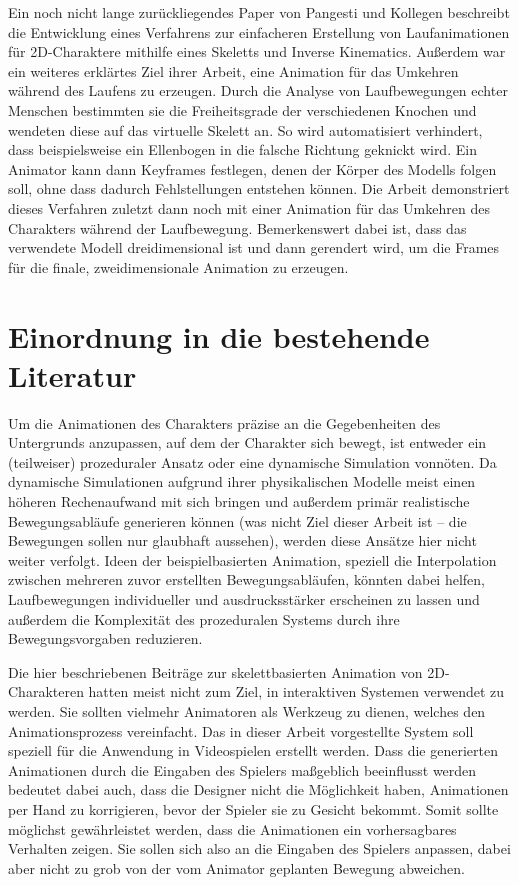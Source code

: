 Ein noch nicht lange zurückliegendes Paper von Pangesti und Kollegen\cite{pangesti2019analysis} beschreibt die Entwicklung eines Verfahrens zur einfacheren Erstellung von Lauf\-a\-ni\-ma\-tio\-nen für 2D-Charaktere mithilfe eines Skeletts und Inverse Kinematics. Außerdem war ein weiteres erklärtes Ziel ihrer Arbeit, eine Animation für das Umkehren während des Laufens zu erzeugen. Durch die Analyse von Laufbewegungen echter Menschen bestimmten sie die Freiheitsgrade der verschiedenen Knochen und wendeten diese auf das virtuelle Skelett an. So wird automatisiert verhindert, dass beispielsweise ein Ellenbogen in die falsche Richtung geknickt wird. Ein Animator kann dann Keyframes festlegen, denen der Körper des Modells folgen soll, ohne dass dadurch Fehlstellungen entstehen können. Die Arbeit demonstriert dieses Verfahren zuletzt dann noch mit einer Animation für das Umkehren des Charakters während der Laufbewegung. Bemerkenswert dabei ist, dass das verwendete Modell dreidimensional ist und dann gerendert wird, um die Frames für die finale, zweidimensionale Animation zu erzeugen.


\section{Einordnung in die bestehende Literatur}
Um die Animationen des Charakters präzise an die Gegebenheiten des Untergrunds anzupassen, auf dem der Charakter sich bewegt, ist entweder ein (teilweiser) prozeduraler Ansatz oder eine dynamische Simulation vonnöten. Da dynamische Simulationen aufgrund ihrer physikalischen Modelle meist einen höheren Rechenaufwand mit sich bringen und außerdem primär realistische Bewegungsabläufe generieren können (was nicht Ziel dieser Arbeit ist -- die Bewegungen sollen nur glaubhaft aussehen), werden diese Ansätze hier nicht weiter verfolgt. Ideen der beispielbasierten Animation, speziell die Interpolation zwischen mehreren zuvor erstellten Bewegungsabläufen, könnten dabei helfen, Laufbewegungen individueller und aus\-drucks\-stär\-ker erscheinen zu lassen und außerdem die Komplexität des prozeduralen Systems durch ihre Bewegungsvorgaben reduzieren.

Die hier beschriebenen Beiträge zur skelettbasierten Animation von 2D-Cha\-rak\-te\-ren hatten meist nicht zum Ziel, in interaktiven Systemen verwendet zu werden. Sie sollten vielmehr Animatoren als Werkzeug zu dienen, welches den Animationsprozess vereinfacht. Das in dieser Arbeit vorgestellte System soll speziell für die Anwendung in Videospielen erstellt werden. Dass die generierten Animationen durch die Eingaben des Spielers maßgeblich beeinflusst werden bedeutet dabei auch, dass die Designer nicht die Möglichkeit haben, Animationen per Hand zu korrigieren, bevor der Spieler sie zu Gesicht bekommt. Somit sollte möglichst gewährleistet werden, dass die Animationen ein vorhersagbares Verhalten zeigen. Sie sollen sich also an die Eingaben des Spielers anpassen, dabei aber nicht zu grob von der vom Animator geplanten Bewegung abweichen.

